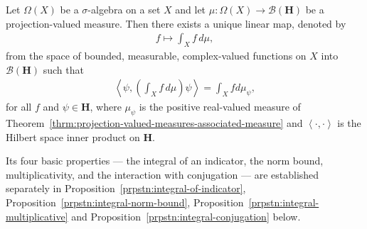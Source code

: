 \begin{theorem}
    \label{thrm:operator-valued-integration}
    \leanok
    Let $\Omega(X)$ be a $\sigma$-algebra on a set $X$ and let $\mu : \Omega(X) \rightarrow \mathcal{B}(\mathbf{H})$ be a projection-valued measure. Then there exists a unique linear map, denoted by
    \begin{align}
        f \longmapsto \int_X f \, d\mu,
    \end{align}
    from the space of bounded, measurable, complex-valued functions on $X$ into $\mathcal{B}(\mathbf{H})$ such that
    \begin{align}
        \left< \psi, \left( \int_X f \, d\mu \right) \psi \right> = \int_X f d\mu_\psi,
    \end{align}
    for all $f$ and $\psi \in \mathbf{H}$, where $\mu_\psi$ is the positive real-valued measure of Theorem~\ref{thrm:projection-valued-measures-associated-measure} and $\left< \cdot, \cdot \right>$ is the Hilbert space inner product on $\mathbf{H}$. 

    Its four basic properties — the integral of an indicator, the norm bound, multiplicativity, and the interaction with conjugation — are established separately in Proposition~\ref{prpstn:integral-of-indicator}, Proposition~\ref{prpstn:integral-norm-bound}, Proposition~\ref{prpstn:integral-multiplicative} and Proposition~\ref{prpstn:integral-conjugation} below.
\end{theorem}
